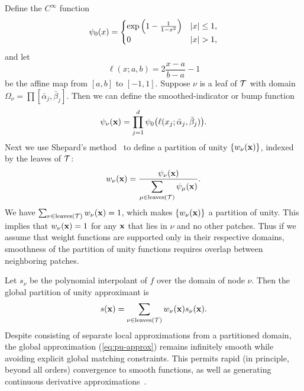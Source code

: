 Define the $C^\infty$ function
\begin{align}
  \label{eq:basic-cinf}
  \psi_0(x) = \begin{cases}
    \exp \left(  1 - \frac{1}{1-x^2}\right) & |x| \leq 1, \\
    0 & |x| > 1,
  \end{cases}
\end{align}
and let
\begin{equation}
  \label{eq:affine}
  \ell(x;a,b) = 2\frac{x-a}{b-a} - 1
\end{equation}
be the affine map from $[a,b]$ to $[-1,1]$. Suppose $\nu$ is a leaf of $\mathcal{T}$ with domain $\Omega_\nu = \prod [\bar{\alpha}_j,\bar{\beta}_j]$. Then we can define the smoothed-indicator or bump function
\begin{equation}
  \label{eq:bump-functions}
  \psi_\nu(\mathbf{x}) = \prod_{j=1}^d \psi_0\bigl( \ell(x_j;\bar{\alpha}_{j},\bar{\beta}_{j}) \bigr).
\end{equation}
Next we use Shepard's method~\cite{wendland2004scattered} to define a partition of unity $\{w_\nu (\mathbf{x})\}$, indexed by the leaves of $\mathcal{T}$:
\begin{equation}
  \label{eq:pu-weight}
  w_\nu(\mathbf{x}) = \frac{\psi_\nu(\mathbf{x})}{\displaystyle \sum_{\mu\in \text{leaves}(\mathcal{T})} \psi_\mu(\mathbf{x})}.
\end{equation}
We have $\sum_{\nu\in \text{leaves}(\mathcal{T})} w_\nu(\mathbf{x}) = 1$, which makes $\{w_\nu (\mathbf{x})\}$ a partition of unity. This implies that  $w_\nu(\mathbf{x})=1$ for any $\mathbf{x}$ that lies in $\nu$ and no other patches. Thus if we assume that weight functions are supported only in their respective domains, smoothness of the partition of unity functions requires overlap between neighboring patches.

 Let $s_\nu$ be the polynomial interpolant of $f$ over the domain of node $\nu$. Then the global partition of unity approximant is
\begin{equation}
  s(\mathbf{x}) = \sum_{\nu\in \text{leaves}(\mathcal{T})} w_\nu(\mathbf{x})s_\nu(\mathbf{x}).
  \label{eq:pu-approx}	
\end{equation}
Despite consisting of separate local approximations from a partitioned domain, the global approximation (\ref{eq:pu-approx}) remains infinitely smooth while avoiding explicit global matching constraints. This permits rapid (in principle, beyond all orders) convergence to smooth functions, as well as generating continuous derivative approximations~\cite{wendland2004scattered}.

